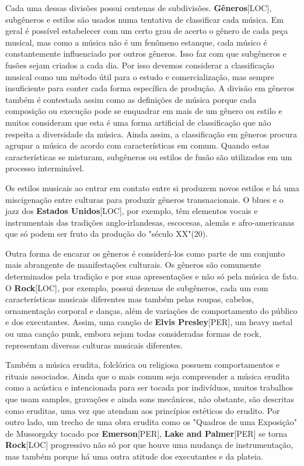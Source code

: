 \documentclass[a4paper,12pt]{article}
\begin{document}
Cada uma dessas divisões possui centenas de subdivisões. \textbf{Gêneros}\textsc{[LOC]}, subgêneros e estilos são usados numa tentativa de classificar cada música. Em geral é possível estabelecer com um certo grau de acerto o gênero de cada peça musical, mas como a música não é um fenômeno estanque, cada músico é constantemente influenciado por outros gêneros. Isso faz com que subgêneros e fusões sejam criados a cada dia. Por isso devemos considerar a classificação musical como um método útil para o estudo e comercialização, mas sempre insuficiente para conter cada forma específica de produção. A divisão em gêneros também é contestada assim como as definições de música porque cada composição ou execução pode se enquadrar em mais de um gênero ou estilo e muitos consideram que esta é uma forma artificial de classificação que não respeita a diversidade da música. Ainda assim, a classificação em gêneros procura agrupar a música de acordo com características em comum. Quando estas características se misturam, subgêneros ou estilos de fusão são utilizados em um processo interminável.

Os estilos musicais ao entrar em contato entre si produzem novos estilos e há uma miscigenação entre culturas para produzir gêneros transnacionais. O blues e o jazz dos \textbf{Estados Unidos}\textsc{[LOC]}, por exemplo, têm elementos vocais e instrumentais das tradições anglo-irlandesas, escocesas, alemãs e afro-americanas que só podem ser fruto da produção do "século XX"(20).

Outra forma de encarar os gêneros é considerá-los como parte de um conjunto mais abrangente de manifestações culturais. Os gêneros são comumente determinados pela tradição e por suas apresentações e não só pela música de fato. O \textbf{Rock}\textsc{[LOC]}, por exemplo, possui dezenas de subgêneros, cada um com características musicais diferentes mas também pelas roupas, cabelos, ornamentação corporal e danças, além de variações de comportamento do público e dos executantes. Assim, uma canção de \textbf{Elvis Presley}\textsc{[PER]}, um heavy metal ou uma canção punk, embora sejam todas consideradas formas de rock, representam diversas culturas musicais diferentes.

Também a música erudita, folclórica ou religiosa possuem comportamentos e rituais associados. Ainda que o mais comum seja compreender a música erudita como a acústica e intencionada para ser tocada por indivíduos, muitos trabalhos que usam samples, gravações e ainda sons mecânicos, não obstante, são descritas como eruditas, uma vez que atendam aos princípios estéticos do erudito. Por outro lado, um trecho de uma obra erudita como os "Quadros de uma Exposição" de Mussorgsky tocado por \textbf{Emerson}\textsc{[PER]}, \textbf{Lake and Palmer}\textsc{[PER]} se torna \textbf{Rock}\textsc{[LOC]} progressivo não só por que houve uma mudança de instrumentação, mas também porque há uma outra atitude dos executantes e da plateia.
\end{document}
